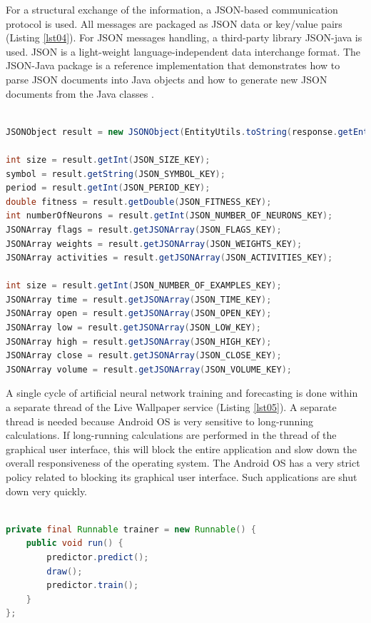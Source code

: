 \documentclass[a4paper,conference]{IEEEtran}
\begin{document}
For a structural exchange of the information, a JSON-based communication protocol is used. All messages are packaged as JSON data or key/value pairs (Listing \ref{lst04}). For JSON messages handling, a third-party library JSON-java is used. JSON is a light-weight language-independent data interchange format. The JSON-Java package is a reference implementation that demonstrates how to parse JSON documents into Java objects and how to generate new JSON documents from the Java classes \cite{Leary-01}.

\begin{lstlisting}[caption=JSON packaging, language=Java, basicstyle=\tiny, label=lst04]

JSONObject result = new JSONObject(EntityUtils.toString(response.getEntity(), "UTF-8"));

int size = result.getInt(JSON_SIZE_KEY);
symbol = result.getString(JSON_SYMBOL_KEY);
period = result.getInt(JSON_PERIOD_KEY);
double fitness = result.getDouble(JSON_FITNESS_KEY);
int numberOfNeurons = result.getInt(JSON_NUMBER_OF_NEURONS_KEY);
JSONArray flags = result.getJSONArray(JSON_FLAGS_KEY);
JSONArray weights = result.getJSONArray(JSON_WEIGHTS_KEY);
JSONArray activities = result.getJSONArray(JSON_ACTIVITIES_KEY);

int size = result.getInt(JSON_NUMBER_OF_EXAMPLES_KEY);
JSONArray time = result.getJSONArray(JSON_TIME_KEY);
JSONArray open = result.getJSONArray(JSON_OPEN_KEY);
JSONArray low = result.getJSONArray(JSON_LOW_KEY);
JSONArray high = result.getJSONArray(JSON_HIGH_KEY);
JSONArray close = result.getJSONArray(JSON_CLOSE_KEY);
JSONArray volume = result.getJSONArray(JSON_VOLUME_KEY);

\end{lstlisting}

A single cycle of artificial neural network training and forecasting is done within a separate thread of the Live Wallpaper service (Listing \ref{lst05}). A separate thread is needed because Android OS is very sensitive to long-running calculations. If long-running calculations are performed in the thread of the graphical user interface, this will block the entire application and slow down the overall responsiveness of the operating system. The Android OS has a very strict policy related to blocking its graphical user interface. Such applications are shut down very quickly.

\begin{lstlisting}[caption=Calculations in separate thread, language=Java, basicstyle=\tiny, label=lst05]

private final Runnable trainer = new Runnable() {
    public void run() {
        predictor.predict();
        draw();
        predictor.train();
    }
};

\end{lstlisting}
\end{document}
